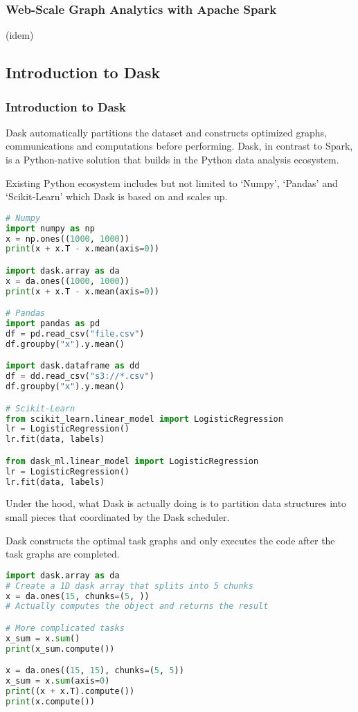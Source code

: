\documentclass{article}
\begin{document}
\subsubsection{Web-Scale Graph Analytics with Apache Spark} (idem)

\subsection{Introduction to Dask}
\subsubsection{Introduction to Dask}

Dask automatically partitions the dataset and constructs optimized graphs, communications and computations before performing. Dask, in contrast to Spark, is a Python-native solution that builds in the Python data analysis ecosystem.

Existing Python ecosystem includes but not limited to `Numpy', `Pandas' and `Scikit-Learn' which Dask is based on and scales up.

\begin{lstlisting}[language=Python]
# Numpy
import numpy as np 
x = np.ones((1000, 1000))
print(x + x.T - x.mean(axis=0))

import dask.array as da 
x = da.ones((1000, 1000))
print(x + x.T - x.mean(axis=0))

# Pandas
import pandas as pd 
df = pd.read_csv("file.csv")
df.groupby("x").y.mean()

import dask.dataframe as dd
df = dd.read_csv("s3://*.csv")
df.groupby("x").y.mean()

# Scikit-Learn
from scikit_learn.linear_model import LogisticRegression
lr = LogisticRegression()
lr.fit(data, labels)

from dask_ml.linear_model import LogisticRegression
lr = LogisticRegression()
lr.fit(data, labels)
\end{lstlisting}

Under the hood, what Dask is actually doing is to partition data structures into small pieces that coordinated by the Dask scheduler.

Dask constructs the optimal task graphs and only executes the code after the task graphs are completed.

\begin{lstlisting}[language=Python]
import dask.array as da
# Create a 1D dask array that splits into 5 chunks
x = da.ones(15, chunks=(5, ))
# Actually computes the object and returns the result

# More complicated tasks
x_sum = x.sum()
print(x_sum.compute())

x = da.ones((15, 15), chunks=(5, 5))
x_sum = x.sum(axis=0)
print((x + x.T).compute())
print(x.compute())
\end{lstlisting}
\end{document}
